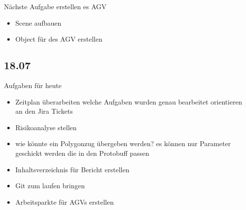 Nächste Aufgabe erstellen es AGV
\begin{itemize}
\item Scene aufbauen
\item Object für des AGV erstellen 
\end{itemize}

\subsection{18.07}
Aufgaben für heute 
\begin{itemize}
\item Zeitplan überarbeiten welche Aufgaben wurden genau bearbeitet orientieren an den Jira Tickets
\item Risikoanalyse stellen
\item wie könnte ein Polygonzug übergeben werden? es können nur Parameter geschickt werden die in den Protobuff passen
\item Inhaltsverzeichnis für Bericht erstellen
\item Git zum laufen bringen 
\item Arbeitsparkte für AGVs erstellen
\end{itemize}

